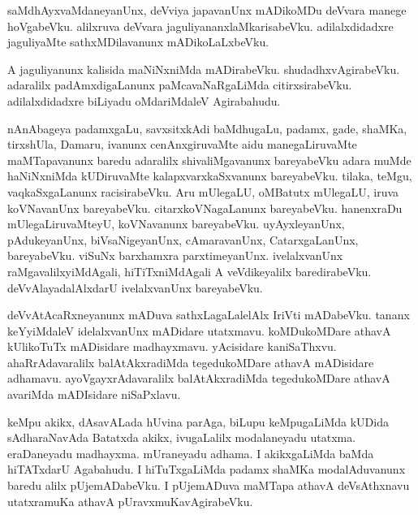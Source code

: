 \documentclass{article}
\begin{document}
\begin{mn}
saMdhAyxvaMdaneyanUnx,  deVviya  japavanUnx  mADikoMDu  deVvara  manege  hoVgabeVku.  alilxruva  
deVvara  jaguliyananxlaMkarisabeVku.  adilalxdidadxre  jaguliyaMte  sathxMDilavanunx  mADikoLaLxbeVku.
\end{mn}

\begin{mn}
A  jaguliyanunx  kalisida  maNiNxniMda  mADirabeVku.  shudadhxvAgirabeVku.  adaralilx  padAmxdigaLanunx  
paMcavaNaRgaLiMda  citirxsirabeVku.  adilalxdidadxre  biLiyadu  oMdariMdaleV  Agirabahudu.
\end{mn}

\begin{mn}
nAnAbageya  padamxgaLu,  savxsitxkAdi  baMdhugaLu,  padamx,  gade,  shaMKa,  tirxshUla,  Damaru,  
ivanunx  cenAnxgiruvaMte  aidu  manegaLiruvaMte  maMTapavanunx  baredu  adaralilx  shivaliMgavanunx  
bareyabeVku  adara  muMde  haNiNxniMda  kUDiruvaMte  kalapxvarxkaSxvanunx  bareyabeVku.  tilaka,  teMgu,  
vaqkaSxgaLanunx  racisirabeVku.  Aru  mUlegaLU,  oMBatutx  mUlegaLU,  iruva  koVNavanUnx  bareyabeVku.  
citarxkoVNagaLanunx  bareyabeVku.  hanenxraDu  mUlegaLiruvaMteyU,  koVNavanunx  bareyabeVku.  uyAyxleyanUnx,  
pAdukeyanUnx,  biVsaNigeyanUnx,  cAmaravanUnx,  CatarxgaLanUnx,  bareyabeVku.  viSuNx  barxhamxra  
parxtimeyanUnx.  ivelalxvanUnx  raMgavalilxyiMdAgali,  hiTiTxniMdAgali  A  veVdikeyalilx  baredirabeVku.  
deVvAlayadalAlxdarU  ivelalxvanUnx  bareyabeVku.
\end{mn}

\begin{mn}
deVvAtAcaRxneyanunx  mADuva  sathxLagaLalelAlx  IriVti  mADabeVku.  tananx  keYyiMdaleV  idelalxvanUnx  
mADidare  utatxmavu.  koMDukoMDare  athavA  kUlikoTuTx  mADisidare  madhayxmavu.  yAcisidare  kaniSaThxvu.  
ahaRrAdavaralilx  balAtAkxradiMda  tegedukoMDare  athavA  mADisidare  adhamavu.  ayoVgayxrAdavaralilx  
balAtAkxradiMda  tegedukoMDare  athavA  avariMda  mADIsidare  niSaPxlavu.
\end{mn}

\begin{mn}
keMpu  akikx,  dAsavALada  hUvina  parAga,  biLupu  keMpugaLiMda  kUDida  sAdharaNavAda  Batatxda  akikx,  
ivugaLalilx  modalaneyadu  utatxma.  eraDaneyadu  madhayxma.  mUraneyadu  adhama.  I  akikxgaLiMda  baMda  
hiTATxdarU  Agabahudu.  I  hiTuTxgaLiMda  padamx  shaMKa  modalAduvanunx  baredu  alilx  pUjemADabeVku.  I  
pUjemADuva  maMTapa  athavA  deVsAthxnavu  utatxramuKa  athavA  pUravxmuKavAgirabeVku.
\end{mn}
\end{document}
